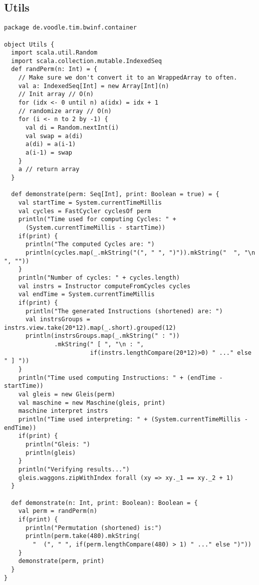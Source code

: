 \subsection{Utils}
\begin{lstlisting}
package de.voodle.tim.bwinf.container

object Utils {
  import scala.util.Random
  import scala.collection.mutable.IndexedSeq
  def randPerm(n: Int) = {
    // Make sure we don't convert it to an WrappedArray to often.
    val a: IndexedSeq[Int] = new Array[Int](n)
    // Init array // O(n)
    for (idx <- 0 until n) a(idx) = idx + 1
    // randomize array // O(n)
    for (i <- n to 2 by -1) {
      val di = Random.nextInt(i)
      val swap = a(di)
      a(di) = a(i-1)
      a(i-1) = swap
    }
    a // return array
  }

  def demonstrate(perm: Seq[Int], print: Boolean = true) = {
    val startTime = System.currentTimeMillis
    val cycles = FastCycler cyclesOf perm
    println("Time used for computing Cycles: " +
      (System.currentTimeMillis - startTime))
    if(print) {
      println("The computed Cycles are: ")
      println(cycles.map(_.mkString("(", " ", ")")).mkString("  ", "\n  ", ""))
    }
    println("Number of cycles: " + cycles.length)
    val instrs = Instructor computeFromCycles cycles
    val endTime = System.currentTimeMillis
    if(print) {
      println("The generated Instructions (shortened) are: ")
      val instrsGroups = instrs.view.take(20*12).map(_.short).grouped(12)
      println(instrsGroups.map(_.mkString(" : "))
              .mkString(" [ ", "\n : ",
                        if(instrs.lengthCompare(20*12)>0) " ..." else " ] "))
    }
    println("Time used computing Instructions: " + (endTime - startTime))
    val gleis = new Gleis(perm)
    val maschine = new Maschine(gleis, print)
    maschine interpret instrs
    println("Time used interpreting: " + (System.currentTimeMillis - endTime))
    if(print) {
      println("Gleis: ")
      println(gleis)
    }
    println("Verifying results...")
    gleis.waggons.zipWithIndex forall (xy => xy._1 == xy._2 + 1)
  }

  def demonstrate(n: Int, print: Boolean): Boolean = {
    val perm = randPerm(n)
    if(print) {
      println("Permutation (shortened) is:")
      println(perm.take(480).mkString(
        "  (", " ", if(perm.lengthCompare(480) > 1) " ..." else ")"))
    }
    demonstrate(perm, print)
  }
}
\end{lstlisting}
\clearpage